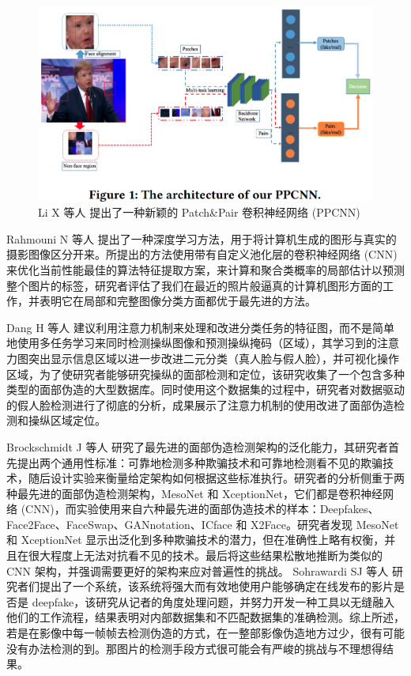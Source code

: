 \begin{figure}[htb]
\centering 
\includegraphics[width=1.05\textwidth]{img/ch3m14.png} 
\caption{Li X 等人 \cite{li2020fighting} 提出了一种新颖的 Patch\&Pair 卷积神经网络 (PPCNN)}
\label{Test}
\end{figure}

Rahmouni N 等人 \cite{rahmouni2017distinguishing} 提出了一种深度学习方法，用于将计算机生成的图形与真实的摄影图像区分开来。所提出的方法使用带有自定义池化层的卷积神经网络 (CNN) 来优化当前性能最佳的算法特征提取方案，来计算和聚合类概率的局部估计以预测整个图片的标签，研究者评估了我们在最近的照片般逼真的计算机图形方面的工作，并表明它在局部和完整图像分类方面都优于最先进的方法。

Dang H 等人  \cite{dang2020detection} 建议利用注意力机制来处理和改进分类任务的特征图，而不是简单地使用多任务学习来同时检测操纵图像和预测操纵掩码（区域），其学习到的注意力图突出显示信息区域以进一步改进二元分类（真人脸与假人脸），并可视化操作区域，为了使研究者能够研究操纵的面部检测和定位，该研究收集了一个包含多种类型的面部伪造的大型数据库。同时使用这个数据集的过程中，研究者对数据驱动的假人脸检测进行了彻底的分析，成果展示了注意力机制的使用改进了面部伪造检测和操纵区域定位。

Brockschmidt J 等人 \cite{brockschmidt2019generality} 研究了最先进的面部伪造检测架构的泛化能力，其研究者首先提出两个通用性标准：可靠地检测多种欺骗技术和可靠地检测看不见的欺骗技术，随后设计实验来衡量给定架构如何根据这些标准执行。研究者的分析侧重于两种最先进的面部伪造检测架构，MesoNet 和 XceptionNet，它们都是卷积神经网络 (CNN)，而实验使用来自六种最先进的面部伪造技术的样本：Deepfakes、Face2Face、FaceSwap、GANnotation、ICface 和 X2Face。研究者发现 MesoNet 和 XceptionNet 显示出泛化到多种欺骗技术的潜力，但在准确性上略有权衡，并且在很大程度上无法对抗看不见的技术。最后将这些结果松散地推断为类似的 CNN 架构，并强调需要更好的架构来应对普遍性的挑战。 Sohrawardi SJ 等人 \cite{sohrawardi2019poster}  研究者们提出了一个系统，该系统将强大而有效地使用户能够确定在线发布的影片是否是 deepfake，该研究从记者的角度处理问题，并努力开发一种工具以无缝融入他们的工作流程，结果表明对内部数据集和不匹配数据集的准确检测。综上所述，若是在影像中每一帧帧去检测伪造的方式，在一整部影像伪造地方过少，很有可能没有办法检测的到。那图片的检测手段方式很可能会有严峻的挑战与不理想得结果。


